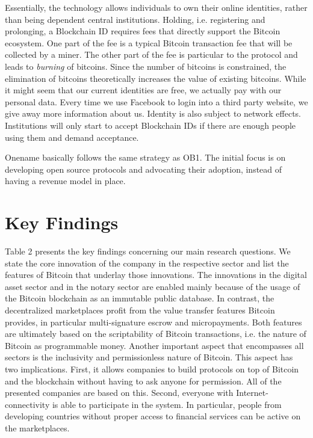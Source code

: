 Essentially, the technology allows individuals to own their online identities, 
rather than being dependent central institutions. Holding, i.e. registering and 
prolonging, a Blockchain ID requires fees that directly support the Bitcoin ecosystem. 
One part of the fee is a typical Bitcoin transaction fee that will be collected 
by a miner. The other part of the fee is particular to the protocol and leads to 
\emph{burning} of bitcoins. Since the number of bitcoins is constrained, the elimination 
of bitcoins theoretically increases the value of existing bitcoins. While it might 
seem that our current identities are free, we actually pay with our personal data. 
Every time we use Facebook to login into a third party website, we give away more 
information about us. Identity is also subject to network effects. Institutions 
will only start to accept Blockchain IDs if there are enough people using them 
and demand acceptance. 

Onename basically follows the same strategy as OB1. The initial focus is on developing 
open source protocols and advocating their adoption, instead of having a revenue 
model in place.

\section{Key Findings}

Table 2 presents the key findings concerning our main research questions. We state 
the core innovation of the company in the respective sector and list the features 
of Bitcoin that underlay those innovations. The innovations in the digital asset 
sector and in the notary sector are enabled mainly because of the usage of the 
Bitcoin blockchain as an immutable public database. In contrast, the decentralized 
marketplaces profit from the value transfer features Bitcoin provides, in particular 
multi-signature escrow and micropayments. Both features are ultimately based on 
the scriptability of Bitcoin transactions, i.e. the nature of Bitcoin as programmable 
money. Another important aspect that encompasses all sectors is the inclusivity 
and permissionless nature of Bitcoin. This aspect has two implications. First, 
it allows companies to build protocols on top of Bitcoin and the blockchain without 
having to ask anyone for permission. All of the presented companies are based on 
this. Second, everyone with Internet-connectivity is able to participate in the 
system. In particular, people from developing countries without proper access to 
financial services can be active on the marketplaces. 

